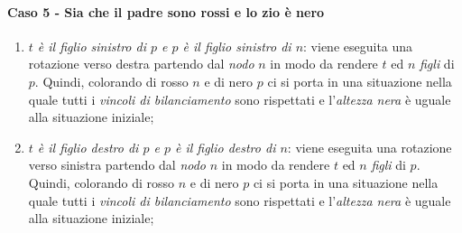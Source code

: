 \paragraph{Caso 5 - Sia  che il padre sono rossi e lo zio è nero}
\begin{enumerate}[label=\alph*.]
    \item \emph{$t$ è il figlio sinistro di $p$ e $p$ è il figlio sinistro di $n$}:
    viene eseguita una rotazione verso destra partendo dal \emph{nodo} $n$ in modo
    da rendere $t$ ed $n$ \emph{figli} di $p$. Quindi, colorando di rosso $n$
    e di nero $p$ ci si porta in una situazione nella quale tutti i
    \emph{vincoli di bilanciamento} sono rispettati e l'\emph{altezza nera} è
    uguale alla situazione iniziale;
    \item \emph{$t$ è il figlio destro di $p$ e $p$ è il figlio destro di $n$}:
    viene eseguita una rotazione verso sinistra partendo dal \emph{nodo} $n$ in
    modo da rendere $t$ ed $n$ \emph{figli} di $p$. Quindi, colorando di rosso
    $n$ e di nero $p$ ci si porta in una situazione nella quale tutti i
    \emph{vincoli di bilanciamento} sono rispettati e l'\emph{altezza nera} è
    uguale alla situazione iniziale;
\end{enumerate}

